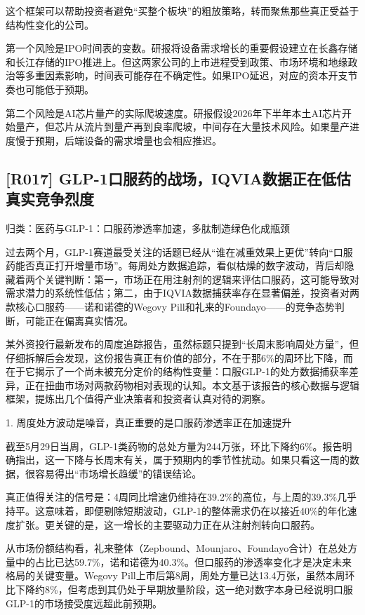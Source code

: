 \documentclass[11pt]{ctexart}
\begin{document}
这个框架可以帮助投资者避免“买整个板块”的粗放策略，转而聚焦那些真正受益于结构性变化的公司。

第一个风险是IPO时间表的变数。研报将设备需求增长的重要假设建立在长鑫存储和长江存储的IPO推进上。但这两家公司的上市进程受到政策、市场环境和地缘政治等多重因素影响，时间表可能存在不确定性。如果IPO延迟，对应的资本开支节奏也可能低于预期。

第二个风险是AI芯片量产的实际爬坡速度。研报假设2026年下半年本土AI芯片开始量产，但芯片从流片到量产再到良率爬坡，中间存在大量技术风险。如果量产进度慢于预期，后端设备的需求增量也会相应推迟。

\subsection{[R017] GLP-1口服药的战场，IQVIA数据正在低估真实竞争烈度}
{\small\color{refgray}归类：医药与GLP-1：口服药渗透率加速，多肽制造绿色化成瓶颈}

过去两个月，GLP-1赛道最受关注的话题已经从“谁在减重效果上更优”转向“口服药能否真正打开增量市场”。每周处方数据追踪，看似枯燥的数字波动，背后却隐藏着两个关键判断：第一，市场正在用注射剂的逻辑来评估口服药，这可能导致对需求潜力的系统性低估；第二，由于IQVIA数据捕获率存在显著偏差，投资者对两款核心口服药——诺和诺德的Wegovy Pill和礼来的Foundayo——的竞争态势判断，可能正在偏离真实情况。

某外资投行最新发布的周度追踪报告，虽然标题只提到“长周末影响周处方量”，但仔细拆解后会发现，这份报告真正有价值的部分，不在于那6\%的周环比下降，而在于它揭示了一个尚未被充分定价的结构性变量：口服GLP-1的处方数据捕获率差异，正在扭曲市场对两款药物相对表现的认知。本文基于该报告的核心数据与逻辑框架，提炼出几个值得产业决策者和投资者认真对待的洞察。

1. 周度处方波动是噪音，真正重要的是口服药渗透率正在加速提升

截至5月29日当周，GLP-1类药物的总处方量为244万张，环比下降约6\%。报告明确指出，这一下降与长周末有关，属于预期内的季节性扰动。如果只看这一周的数据，很容易得出“市场增长趋缓”的错误结论。

真正值得关注的信号是：4周同比增速仍维持在39.2\%的高位，与上周的39.3\%几乎持平。这意味着，即便剔除短期波动，GLP-1的整体需求仍在以接近40\%的年化速度扩张。更关键的是，这一增长的主要驱动力正在从注射剂转向口服药。

从市场份额结构看，礼来整体（Zepbound、Mounjaro、Foundayo合计）在总处方量中的占比已达59.7\%，诺和诺德为40.3\%。但口服药的渗透率变化才是决定未来格局的关键变量。Wegovy Pill上市后第8周，周处方量已达13.4万张，虽然本周环比下降约8\%，但考虑到其仍处于早期放量阶段，这一绝对数字本身已经说明口服GLP-1的市场接受度远超此前预期。
\end{document}

